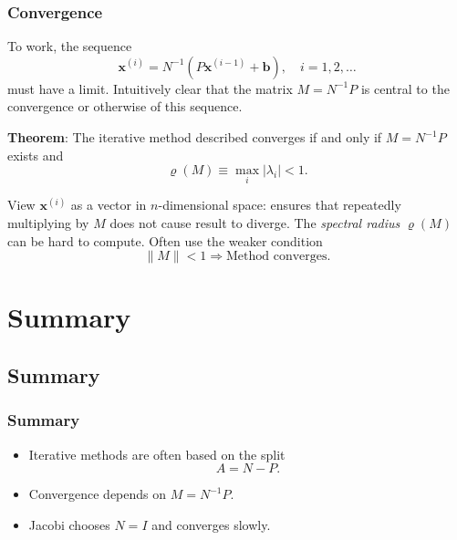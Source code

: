 \documentclass{beamer}
\newcommand{\bb}{{\boldsymbol{b}}}
\newcommand{\bx}{{\boldsymbol{x}}}
\begin{document}
\begin{frame}
  \frametitle{Convergence}

  To work, the sequence
  \begin{equation*}
    \bx^{(i)} = N^{-1} \left( P \bx^{(i - 1)} + \bb \right), \quad i =
    1, 2, \dots
  \end{equation*}
  must have a limit.  Intuitively clear that the matrix $M =
  N^{-1} P$ is central to the convergence or otherwise of
  this sequence.

  \vspace{1ex}

  {\bf Theorem}: The iterative method described converges if and only
  if $M = N^{-1} P$ exists and
  \begin{equation*}
    \varrho (M) \equiv \max_i | \lambda_i | < 1.
  \end{equation*}

  \begin{overlayarea}{\textwidth}{0.3\textheight}
    {
      View $\bx^{(i)}$ as a vector in $n$-dimensional space: ensures
      that repeatedly multiplying by $M$ does not cause result to
      diverge.
    }
    {
      The \emph{spectral radius} $\varrho (M)$ can be hard
      to compute. Often use the weaker condition
      \begin{equation*}
        \| M \| < 1 \Rightarrow \text{Method converges}.
      \end{equation*}
    }
  \end{overlayarea}

\end{frame}


\section{Summary}

\subsection{Summary}

\begin{frame}
  \frametitle{Summary}

  \begin{itemize}
  \item Iterative methods are often based on the split
    \begin{equation*}
      A = N - P.
    \end{equation*}
  \item Convergence depends on $M = N^{-1}P$.
  \item Jacobi chooses $N = I$ and converges slowly.
  \end{itemize}

\end{frame}
\end{document}
